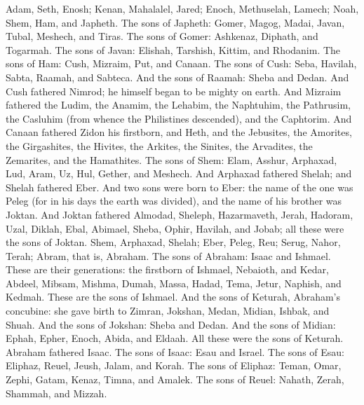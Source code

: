 
\begin{biblechapter} %
 Adam, Seth, Enosh;
\verse Kenan, Mahalalel, Jared;
\verse Enoch, Methuselah, Lamech;
\verse Noah, Shem, Ham, and Japheth.
\verse The sons of Japheth: Gomer, Magog, Madai, Javan, Tubal, Meshech, and Tiras.
\verse The sons of Gomer: Ashkenaz, Diphath, and Togarmah.
\verse The sons of Javan: Elishah, Tarshish, Kittim, and Rhodanim.
\verse The sons of Ham: Cush, Mizraim, Put, and Canaan.
\verse The sons of Cush: Seba, Havilah, Sabta, Raamah, and Sabteca. And the sons of Raamah: Sheba and Dedan.
\verse And Cush fathered Nimrod; he himself began to be mighty on earth.
\verse And Mizraim fathered the Ludim, the Anamim, the Lehabim, the Naphtuhim,
\verse the Pathrusim, the Casluhim (from whence the Philistines descended), and the Caphtorim.
\verse And Canaan fathered Zidon his firstborn, and Heth,
\verse and the Jebusites, the Amorites, the Girgashites,
\verse the Hivites, the Arkites, the Sinites,
\verse the Arvadites, the Zemarites, and the Hamathites.
\verse The sons of Shem: Elam, Asshur, Arphaxad, Lud, Aram, Uz, Hul, Gether, and Meshech.
\verse And Arphaxad fathered Shelah; and Shelah fathered Eber.
\verse And two sons were born to Eber: the name of the one was Peleg (for in his days the earth was divided), and the name of his brother was Joktan.
\verse And Joktan fathered Almodad, Sheleph, Hazarmaveth, Jerah,
\verse Hadoram, Uzal, Diklah,
\verse Ebal, Abimael, Sheba,
\verse Ophir, Havilah, and Jobab; all these were the sons of Joktan.
\verse Shem, Arphaxad, Shelah;
\verse Eber, Peleg, Reu;
\verse Serug, Nahor, Terah;
\verse Abram, that is, Abraham.
\verse The sons of Abraham: Isaac and Ishmael.
\verse These are their generations: the firstborn of Ishmael, Nebaioth, and Kedar, Abdeel, Mibsam,
\verse Mishma, Dumah, Massa, Hadad, Tema,
\verse Jetur, Naphish, and Kedmah. These are the sons of Ishmael.
\verse And the sons of Keturah, Abraham’s concubine: she gave birth to Zimran, Jokshan, Medan, Midian, Ishbak, and Shuah. And the sons of Jokshan: Sheba and Dedan.
\verse And the sons of Midian: Ephah, Epher, Enoch, Abida, and Eldaah. All these were the sons of Keturah.
\verse Abraham fathered Isaac. The sons of Isaac: Esau and Israel.
\verse The sons of Esau: Eliphaz, Reuel, Jeush, Jalam, and Korah.
\verse The sons of Eliphaz: Teman, Omar, Zephi, Gatam, Kenaz, Timna, and Amalek.
\verse The sons of Reuel: Nahath, Zerah, Shammah, and Mizzah.

\end{biblechapter}
